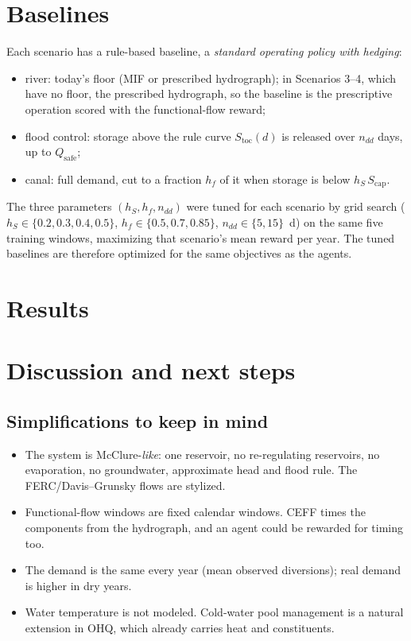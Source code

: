 \documentclass[11pt]{article}
\newcommand{\Scap}{S_{\mathrm{cap}}}
\newcommand{\Qsafe}{Q_{\mathrm{safe}}}
\begin{document}
\section{Baselines}
\label{sec:baselines}
Each scenario has a rule-based baseline, a \emph{standard operating policy
with hedging}:
\begin{itemize}
\item river: today's floor (MIF or prescribed hydrograph); in Scenarios 3--4,
  which have no floor, the prescribed hydrograph, so the baseline is the
  prescriptive operation scored with the functional-flow reward;
\item flood control: storage above the rule curve $S_{\mathrm{toc}}(d)$ is
  released over $n_{dd}$ days, up to $\Qsafe$;
\item canal: full demand, cut to a fraction $h_f$ of it when storage is below
  $h_S\,\Scap$.
\end{itemize}
The three parameters $(h_S, h_f, n_{dd})$ were tuned for each scenario by
grid search ($h_S\in\{0.2,0.3,0.4,0.5\}$, $h_f\in\{0.5,0.7,0.85\}$,
$n_{dd}\in\{5,15\}$~d) on the same five training windows, maximizing that
scenario's mean reward per year. The tuned baselines are therefore
optimized for the same objectives as the agents.

\section{Results}
\label{sec:results}

\section{Discussion and next steps}
\label{sec:discussion}

\subsection*{Simplifications to keep in mind}
\begin{itemize}
\item The system is McClure-\emph{like}: one reservoir, no re-regulating
  reservoirs, no evaporation, no groundwater, approximate head and flood
  rule. The FERC/Davis--Grunsky flows are stylized.
\item Functional-flow windows are fixed calendar windows. CEFF times the
  components from the hydrograph, and an agent could be rewarded for
  timing too.
\item The demand is the same every year (mean observed diversions); real
  demand is higher in dry years.
\item Water temperature is not modeled. Cold-water pool management is a
  natural extension in OHQ, which already carries heat and constituents.
\end{itemize}
\end{document}
